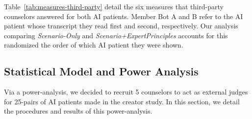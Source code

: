 \documentclass[11pt]{article}
\begin{document}
Table~\ref{tab:measures-third-party} detail the six measures that third-party counselors answered for both AI patients.  Member Bot A and B refer to the AI patient whose transcript they read first and second, respectively.  Our analysis comparing \textit{Scenario-Only} and \textit{Scenario+ExpertPrinciples} accounts for this randomized the order of which AI patient they were shown.  

\begin{table}[!h]
    \centering
    \caption{Six measures used by third-party counselors to judge the AI patients from an unbiased, external perspective.  Although the six dimensions largely overlap with those used in the creator study, the wording needed to be rephrased for the third-party perspective.}
    \label{tab:measures-third-party}
\end{table}

\subsection{Statistical Model and Power Analysis} \label{appendix-sec:third-party-power-analysis}

Via a power-analysis, we decided to recruit 5 counselors to act as external judges for 25-pairs of AI patients made in the creator study. In this section, we detail the procedures and results of this power-analysis. 
\end{document}

